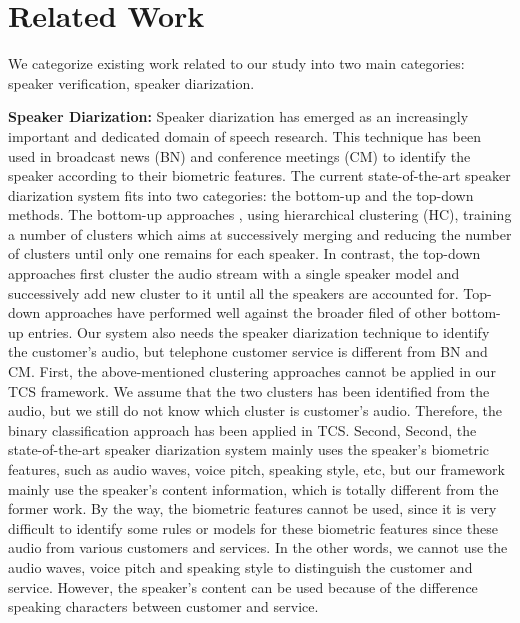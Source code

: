 \section{Related Work}
\label{sec:relatedwork}

We categorize existing work related to our study into two main categories: speaker verification, speaker diarization.

\noindent \textbf{Speaker Diarization:} Speaker diarization has emerged as an increasingly important and dedicated domain of speech research. This technique has been used in broadcast news (BN) and conference meetings (CM) to identify the speaker according to their biometric features. The current state-of-the-art speaker diarization system fits into two categories: the bottom-up and the top-down methods. The bottom-up approaches \cite{Anguera2006Robust, Nguyen2009The, Nwe2012Speaker}, using hierarchical clustering (HC), training a number of clusters which aims at successively merging and reducing the number of clusters until only one remains for each speaker. In contrast, the top-down approaches \cite{Fredouille2006Technical, Bozonnet2010The, Fredouille2009The} first cluster the audio stream with a single speaker model and successively add new cluster to it until all the speakers are accounted for. Top-down approaches have performed well against the broader filed of other bottom-up entries. Our system also needs the speaker diarization technique to identify the customer's audio, but telephone customer service is different from BN and CM. First, the above-mentioned clustering approaches cannot be applied in our TCS framework. We assume that the two clusters has been identified from the audio, but we still do not know which cluster is customer's audio. Therefore, the binary classification approach has been applied in TCS. Second, Second, the state-of-the-art speaker diarization system mainly uses the speaker's biometric features, such as audio waves, voice pitch, speaking style, etc, but our framework mainly use the speaker's content information, which is totally different from the former work. By the way, the biometric features cannot be used, since it is very difficult to identify some rules or models for these biometric features since these audio from various customers and services. In the other words, we cannot use the audio waves, voice pitch and speaking style to distinguish the customer and service. However, the speaker's content can be used because of the difference speaking characters between customer and service.

